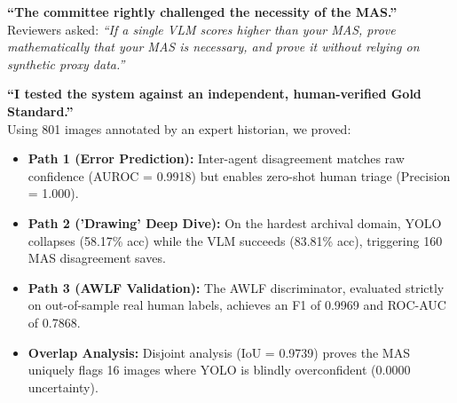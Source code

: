 \documentclass[11pt, a4paper]{article}
\begin{document}
\begin{tcolorbox}[enhanced, colback=gray!5, colframe=gray!80!black, title=\textbf{Chapter 4: The Committee's Challenge}]
\textbf{``The committee rightly challenged the necessity of the MAS.''} \\
Reviewers asked: \textit{``If a single VLM scores higher than your MAS, prove mathematically that your MAS is necessary, and prove it without relying on synthetic proxy data.''}
\end{tcolorbox}

\begin{tcolorbox}[enhanced, colback=Phase4!5, colframe=Phase4!80!black, title=\textbf{Chapter 5: The Empirical Proof (The Final Masterpiece)}]
\textbf{``I tested the system against an independent, human-verified Gold Standard.''} \\
Using 801 images annotated by an expert historian, we proved:
\begin{itemize}[leftmargin=*, nosep]
    \item \textbf{Path 1 (Error Prediction):} Inter-agent disagreement matches raw confidence (AUROC = 0.9918) but enables zero-shot human triage (Precision = 1.000).
    \item \textbf{Path 2 ('Drawing' Deep Dive):} On the hardest archival domain, YOLO collapses (58.17\% acc) while the VLM succeeds (83.81\% acc), triggering 160 MAS disagreement saves.
    \item \textbf{Path 3 (AWLF Validation):} The AWLF discriminator, evaluated strictly on out-of-sample real human labels, achieves an F1 of 0.9969 and ROC-AUC of 0.7868.
    \item \textbf{Overlap Analysis:} Disjoint analysis (IoU = 0.9739) proves the MAS uniquely flags 16 images where YOLO is blindly overconfident (0.0000 uncertainty).
\end{itemize}
\end{tcolorbox}
\end{document}

